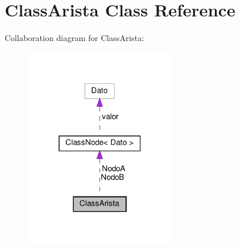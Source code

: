 \hypertarget{class_class_arista}{}\section{Class\+Arista Class Reference}
\label{class_class_arista}


Collaboration diagram for Class\+Arista\+:
\nopagebreak
\begin{figure}[H]
\begin{center}
\leavevmode
\includegraphics[width=184pt]{class_class_arista__coll__graph}
\end{center}
\end{figure}
